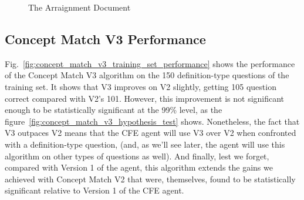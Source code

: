 \begin{figure}
\centering
\vspace{0.75in}
\caption{The Arraignment Document}
\label{fig:concept_match_v3_example_document}
\end{figure}


\subsection{Concept Match V3 Performance}

Fig.~\ref{fig:concept_match_v3_training_set_performance} shows the performance of the Concept Match V3 algorithm on the 150 definition-type questions of the training set.  It shows that V3 improves on V2 slightly, getting 105 question correct compared with V2's 101.  However, this improvement is not significant enough to be statistically significant at the 99\% level, as the figure~\ref{fig:concept_match_v3_hypothesis_test} shows.  Nonetheless, the fact that V3 outpaces V2 means that the CFE agent will use V3 over V2 when confronted with a definition-type question, (and, as we'll see later, the agent will use this algorithm on other types of questions as well).  And finally, lest we forget, compared with Version 1 of the agent, this algorithm extends the gains we achieved with Concept Match V2 that were, themselves, found to be statistically significant relative to Version 1 of the CFE agent.

